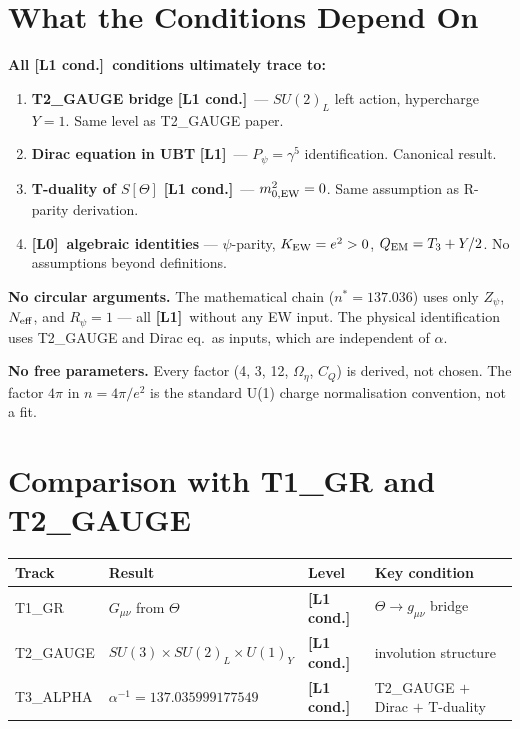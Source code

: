 \documentclass[12pt,a4paper]{article}
\theoremstyle{remark}\newtheorem{remark}[theorem]{Remark}
\newcommand{\Lz}{\textbf{[L0]}}
\newcommand{\Lo}{\textbf{[L1]}}
\newcommand{\Lc}{\textbf{[L1 cond.]}}
\begin{document}
\section{What the Conditions Depend On}
\label{sec:depend}

\begin{insightbox}
\textbf{All \Lc\ conditions ultimately trace to:}
\begin{enumerate}
\item \textbf{T2\_GAUGE bridge} \Lc\ — $SU(2)_L$ left action,
  hypercharge $Y=1$.  Same level as T2\_GAUGE paper.
\item \textbf{Dirac equation in UBT} \Lo\ — $P_\psi=\gamma^5$
  identification. Canonical result.
\item \textbf{T-duality of $S[\Theta]$} \Lc\ — $m^2_{0,\rm EW}=0$.
  Same assumption as R-parity derivation.
\item \textbf{\Lz\ algebraic identities} — $\psi$-parity, $K_{\rm EW}=e^2>0$,
  $Q_{\rm EM}=T_3+Y/2$. No assumptions beyond definitions.
\end{enumerate}

\textbf{No circular arguments.}
The mathematical chain ($n^*=137.036$) uses only $Z_\psi$, $N_{\rm eff}$,
and $R_\psi=1$ — all \Lo\ without any EW input.
The physical identification uses T2\_GAUGE and Dirac eq.\ as inputs,
which are independent of $\alpha$.

\textbf{No free parameters.}
Every factor (4, 3, 12, $\Omega_\eta$, $C_Q$) is derived, not chosen.
The factor $4\pi$ in $n=4\pi/e^2$ is the standard U(1) charge normalisation
convention, not a fit.
\end{insightbox}

\section{Comparison with T1\_GR and T2\_GAUGE}
\label{sec:compare}

\begin{center}
\renewcommand{\arraystretch}{1.25}
\begin{tabular}{llll}
\toprule
Track & Result & Level & Key condition \\
\midrule
T1\_GR & $G_{\mu\nu}$ from $\Theta$ & \Lc & $\Theta\to g_{\mu\nu}$ bridge \\
T2\_GAUGE & $SU(3)\times SU(2)_L\times U(1)_Y$ & \Lc & involution structure \\
T3\_ALPHA & $\alpha^{-1}=137.035999177549$ & \Lc & T2\_GAUGE $+$ Dirac $+$ T-duality \\
\bottomrule
\end{tabular}
\end{center}
\end{document}
